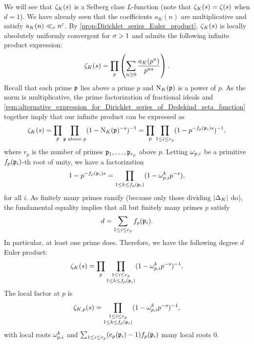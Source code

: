       We will see that $\zeta_{K}(s)$ is a Selberg class $L$-function (note that $\zeta_{K}(s) = \zeta(s)$ when $d = 1$). We have already seen that the coefficients $a_{K}(n)$ are multiplicative and satisfy $a_{K}(n) \ll_{\varepsilon} n^{\varepsilon}$. By \cref{prop:Dirichlet_series_Euler_product}, $\zeta_{K}(s)$ is locally absolutely uniformly convergent for $\sigma > 1$ and admits the following infinite product expression:
      \[
        \zeta_{K}(s) = \prod_{p}\left(\sum_{n \ge 0}\frac{a_{K}(p^{n})}{p^{ns}}\right).
      \]
      Recall that each prime $\mathfrak{p}$ lies above a prime $p$ and $\operatorname{\mathrm{N}}_{K}(\mathfrak{p})$ is a power of $p$. As the norm is multiplicative, the prime factorization of fractional ideals and \cref{rem:alternative_expression_for_Dirichlet_series_of_Dedekind_zeta_function} together imply that our infinite product can be expressed as
      \[
        \zeta_{K}(s) = \prod_{p}\prod_{\text{$\mathfrak{p}$ above $p$}}(1-\operatorname{\mathrm{N}}_{K}(\mathfrak{p})^{-s})^{-1} = \prod_{p}\prod_{1 \le i \le r_{p}}(1-p^{-f_{p}(\mathfrak{p}_{i})s})^{-1},
      \]
      where $r_{p}$ is the number of primes $\mathfrak{p}_{1},\ldots,\mathfrak{p}_{r_{p}}$ above $p$. Letting $\omega_{p,i}$ be a primitive $f_{p}(\mathfrak{p}_{i})$-th root of unity, we have a factorization
      \[
        1-p^{-f_{p}(\mathfrak{p}_{i})s} = \prod_{1 \le k \le f_{p}(\mathfrak{p}_{i})}(1-\omega_{p,i}^{k}p^{-s}),
      \]
      for all $i$. As finitely many primes ramify (because only those dividing $|\Delta_{K}|$ do), the fundamental equality implies that all but finitely many primes $p$ satisfy
      \[
        d = \sum_{1 \le i \le r_{p}}f_{p}(\mathfrak{p}_{i}).
      \]
      In particular, at least one prime does. Therefore, we have the following degree $d$ Euler product:
      \[
        \zeta_{K}(s) = \prod_{p}\prod_{\substack{1 \le i \le r_{p} \\ 1 \le k \le f_{p}(\mathfrak{p}_{i})}}(1-\omega_{p,i}^{k}p^{-s})^{-1}.
      \]
      The local factor at $p$ is
      \[
        \zeta_{K,p}(s) = \prod_{\substack{1 \le i \le r_{p} \\ 1 \le k \le f_{p}(\mathfrak{p}_{i})}}(1-\omega_{p,i}^{k}p^{-s})^{-1},
      \]
      with local roots $\omega_{p,i}^{k}$ and $\sum_{1 \le i \le r_{p}}(e_{p}(\mathfrak{p}_{i})-1)f_{p}(\mathfrak{p}_{i})$ many local roots $0$.
